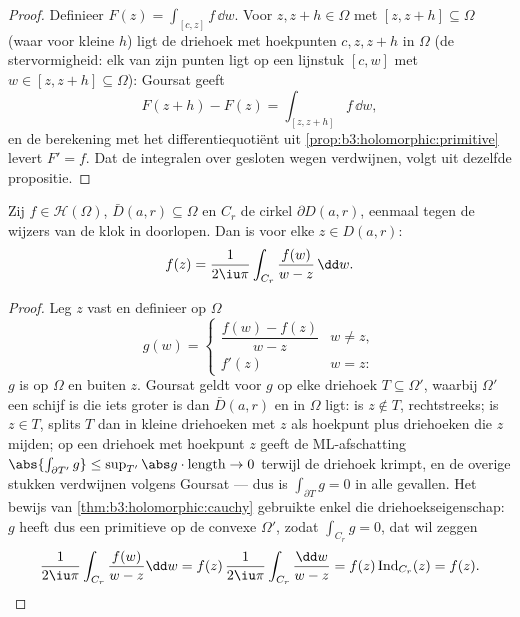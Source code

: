 \begin{proof}
Definieer $F(z) = \int_{[c,z]}f\,\dd w$. Voor $z, z + h \in
\Omega$ met $[z, z+h] \subseteq \Omega$ (waar voor kleine $h$)
ligt de driehoek met hoekpunten $c, z, z+h$ in $\Omega$ (de
stervormigheid: elk van zijn punten ligt op een lijnstuk $[c,
w]$ met $w \in [z, z+h] \subseteq \Omega$): Goursat geeft
\[
F(z + h) - F(z) = \int_{[z, z+h]}f\,\dd w,
\]
en de berekening met het differentiequotiënt uit
\cref{prop:b3:holomorphic:primitive} levert $F' = f$. Dat de
integralen over gesloten wegen verdwijnen, volgt uit dezelfde
propositie.
\end{proof}

\begin{theorem}
\label{thm:b3:holomorphic:formula}
Zij $f \in \mathcal H(\Omega)$, $\bar D(a, r) \subseteq \Omega$
en $C_r$ de cirkel $\partial D(a,r)$, eenmaal tegen de wijzers
van de klok in doorlopen. Dan is voor elke $z \in D(a,
r)$:
\[
f(z) = \frac1{2\iu\pi}\int_{C_r}\frac{f(w)}{w - z}\,\dd w .
\]
\end{theorem}

\begin{proof}
Leg $z$ vast en definieer op $\Omega$
\[
g(w) = \begin{cases}
\dfrac{f(w) - f(z)}{w - z} & w \neq z,\\[4pt]
f'(z) & w = z :
\end{cases}
\]
$g$ is  op $\Omega$ en  buiten $z$. Goursat geldt
voor $g$ op elke driehoek $T \subseteq \Omega'$, waarbij
$\Omega'$ een schijf is die iets groter is dan $\bar D(a,r)$ en
in $\Omega$ ligt: is $z \notin T$, rechtstreeks; is $z \in T$,
splits $T$ dan in kleine driehoeken met $z$ als hoekpunt plus
driehoeken die $z$ mijden; op een driehoek met hoekpunt $z$ geeft
de ML-afschatting $\abs{\int_{\partial T'}g} \leq \sup_{T'}\abs
g\cdot\operatorname{length} \to 0$ terwijl de driehoek krimpt, en
de overige stukken verdwijnen volgens Goursat --- dus is
$\int_{\partial T}g = 0$ in alle gevallen. Het bewijs van
\cref{thm:b3:holomorphic:cauchy} gebruikte enkel die
driehoekseigenschap: $g$ heeft dus een primitieve op de convexe
$\Omega'$, zodat $\int_{C_r}g = 0$, dat wil zeggen
\[
\frac1{2\iu\pi}\int_{C_r}\frac{f(w)}{w - z}\dd w
= f(z)\,\frac{1}{2\iu\pi}\int_{C_r}\frac{\dd w}{w - z}
= f(z)\operatorname{Ind}_{C_r}(z) = f(z) .
\]
\end{proof}

